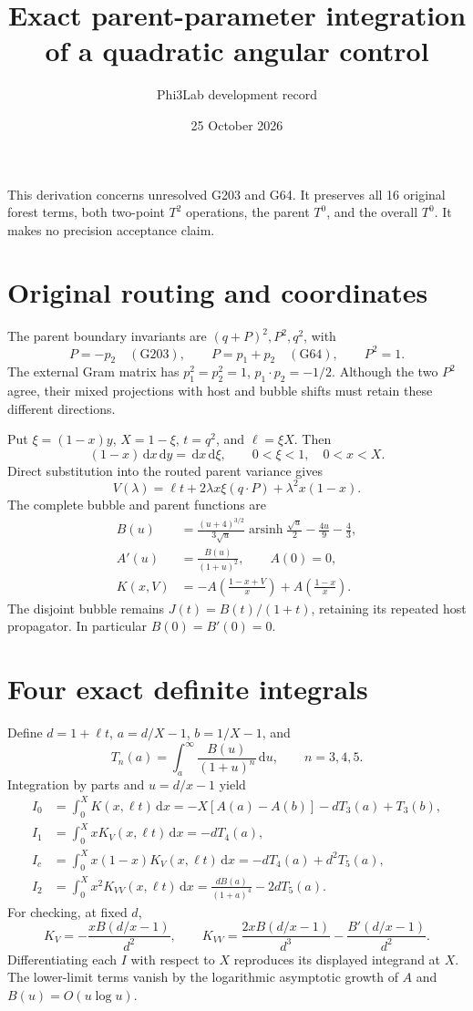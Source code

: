 \documentclass[11pt]{article}
\title{Exact parent-parameter integration of a quadratic angular control}
\author{Phi3Lab development record}
\date{25 October 2026}
\newcommand{\dd}{\,\mathrm d}
\begin{document}
\maketitle
\noindent This derivation concerns unresolved G203 and G64. It preserves all
16 original forest terms, both two-point \(T^2\) operations, the parent \(T^0\),
and the overall \(T^0\). It makes no precision acceptance claim.

\section*{Original routing and coordinates}
The parent boundary invariants are \((q+P)^2,P^2,q^2\), with
\[
 P=-p_2\quad(\mathrm{G203}),\qquad
 P=p_1+p_2\quad(\mathrm{G64}),\qquad P^2=1.
\]
The external Gram matrix has \(p_1^2=p_2^2=1\),
\(p_1\cdot p_2=-1/2\). Although the two \(P^2\) agree, their mixed projections
with host and bubble shifts must retain these different directions.

Put \(\xi=(1-x)y\), \(X=1-\xi\), \(t=q^2\), and \(\ell=\xi X\).
Then
\[
 (1-x)\dd x\dd y=\dd x\dd\xi,\qquad 0<\xi<1,\quad 0<x<X.
\]
Direct substitution into the routed parent variance gives
\[
 V(\lambda)=\ell t+2\lambda x\xi(q\cdot P)+\lambda^2x(1-x).
\]
The complete bubble and parent functions are
\begin{align*}
 B(u)&=\frac{(u+4)^{3/2}}{3\sqrt u}
       \operatorname{arsinh}\frac{\sqrt u}{2}-\frac{4u}{9}-\frac43,\\
 A'(u)&=\frac{B(u)}{(1+u)^2},\qquad A(0)=0,\\
 K(x,V)&=-A\!\left(\frac{1-x+V}{x}\right)
             +A\!\left(\frac{1-x}{x}\right).
\end{align*}
The disjoint bubble remains \(J(t)=B(t)/(1+t)\), retaining its repeated host
propagator. In particular \(B(0)=B'(0)=0\).

\section*{Four exact definite integrals}
Define \(d=1+\ell t\), \(a=d/X-1\), \(b=1/X-1\), and
\[
 T_n(a)=\int_a^\infty\frac{B(u)}{(1+u)^n}\dd u,\qquad n=3,4,5.
\]
Integration by parts and \(u=d/x-1\) yield
\begin{align*}
 I_0&=\int_0^X K(x,\ell t)\dd x
     =-X[A(a)-A(b)]-dT_3(a)+T_3(b),\\
 I_1&=\int_0^X xK_V(x,\ell t)\dd x=-dT_4(a),\\
 I_c&=\int_0^X x(1-x)K_V(x,\ell t)\dd x
       =-dT_4(a)+d^2T_5(a),\\
 I_2&=\int_0^X x^2K_{VV}(x,\ell t)\dd x
       =\frac{dB(a)}{(1+a)^4}-2dT_5(a).
\end{align*}
For checking, at fixed \(d\),
\[
 K_V=-\frac{xB(d/x-1)}{d^2},\qquad
 K_{VV}=\frac{2xB(d/x-1)}{d^3}
             -\frac{B'(d/x-1)}{d^2}.
\]
Differentiating each \(I\) with respect to \(X\) reproduces its displayed
integrand at \(X\). The lower-limit terms vanish by the logarithmic
asymptotic growth of \(A\) and \(B(u)=O(u\log u)\).
\end{document}
